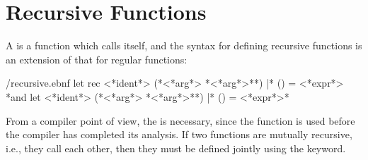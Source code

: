 \documentclass[fsharpNotes.tex]{subfiles}
\begin{document}
\section{Recursive Functions}
A  is a function which calls itself, and the syntax for defining recursive functions is an extension of that for regular functions:
%
\begin{verbatimwrite}{\ebnf/recursive.ebnf}
let rec <*ident*> (*<*arg*> {*<*arg*>*}*) |* () =
  <*expr*>
{*and let <*ident*> (*<*arg*> {*<*arg*>*}*) |* () =
  <*expr*>*}
\end{verbatimwrite}
%
From a compiler point of view, the  is necessary, since the function is used before the compiler has completed its analysis. If two functions are mutually recursive, i.e., they call each other, then they must be defined jointly using the  keyword.
\end{document}

